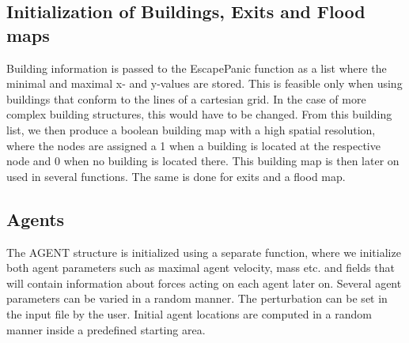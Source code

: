 \documentclass[11pt]{article}
\begin{document}
\subsection{Initialization of Buildings, Exits and Flood maps}
Building information is passed to the EscapePanic function as a list where the minimal and maximal x- and y-values are stored. This is feasible only when using buildings that conform to the lines of a cartesian grid. In the case of more complex building structures, this would have to be changed. From this building list, we then produce a boolean building map with a high spatial resolution, where the nodes are assigned a 1 when a building is located at the respective node and 0 when no building is located there. This building map is then later on used in several functions. The same is done for exits and a flood map.
\subsection{Agents}
The AGENT structure is initialized using a separate function, where we initialize both agent parameters such as maximal agent velocity, mass etc. and fields that will contain information about forces acting on each agent later on. Several agent parameters can be varied in a random manner. The perturbation can be set in the input file by the user. Initial agent locations are computed in a random manner inside a predefined starting area.
\end{document}
